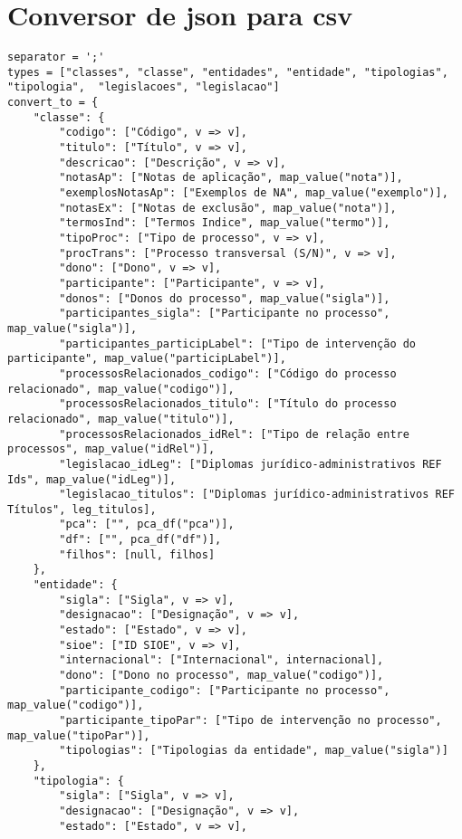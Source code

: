 \section{Conversor de \acrshort{json} para \acrshort{csv}}\label{exem:convCSV}
\begin{lstlisting}[language=pseudocode, caption=Algorítmo de conversão de \acrshort{json} para \acrshort{csv}]
separator = ';'
types = ["classes", "classe", "entidades", "entidade", "tipologias", "tipologia",  "legislacoes", "legislacao"]
convert_to = {
    "classe": {
        "codigo": ["Código", v => v],
        "titulo": ["Título", v => v],
        "descricao": ["Descrição", v => v],
        "notasAp": ["Notas de aplicação", map_value("nota")],
        "exemplosNotasAp": ["Exemplos de NA", map_value("exemplo")],
        "notasEx": ["Notas de exclusão", map_value("nota")],
        "termosInd": ["Termos Indice", map_value("termo")],
        "tipoProc": ["Tipo de processo", v => v],
        "procTrans": ["Processo transversal (S/N)", v => v],
        "dono": ["Dono", v => v],
        "participante": ["Participante", v => v],
        "donos": ["Donos do processo", map_value("sigla")],
        "participantes_sigla": ["Participante no processo", map_value("sigla")],
        "participantes_participLabel": ["Tipo de intervenção do participante", map_value("participLabel")],
        "processosRelacionados_codigo": ["Código do processo relacionado", map_value("codigo")],
        "processosRelacionados_titulo": ["Título do processo relacionado", map_value("titulo")],
        "processosRelacionados_idRel": ["Tipo de relação entre processos", map_value("idRel")],
        "legislacao_idLeg": ["Diplomas jurídico-administrativos REF Ids", map_value("idLeg")],
        "legislacao_titulos": ["Diplomas jurídico-administrativos REF Títulos", leg_titulos],
        "pca": ["", pca_df("pca")],
        "df": ["", pca_df("df")],
        "filhos": [null, filhos]
    },
    "entidade": {
        "sigla": ["Sigla", v => v],
        "designacao": ["Designação", v => v],
        "estado": ["Estado", v => v],
        "sioe": ["ID SIOE", v => v],
        "internacional": ["Internacional", internacional],
        "dono": ["Dono no processo", map_value("codigo")],
        "participante_codigo": ["Participante no processo", map_value("codigo")],
        "participante_tipoPar": ["Tipo de intervenção no processo", map_value("tipoPar")],
        "tipologias": ["Tipologias da entidade", map_value("sigla")]
    },
    "tipologia": {
        "sigla": ["Sigla", v => v],
        "designacao": ["Designação", v => v],
        "estado": ["Estado", v => v],

\end{lstlisting}
